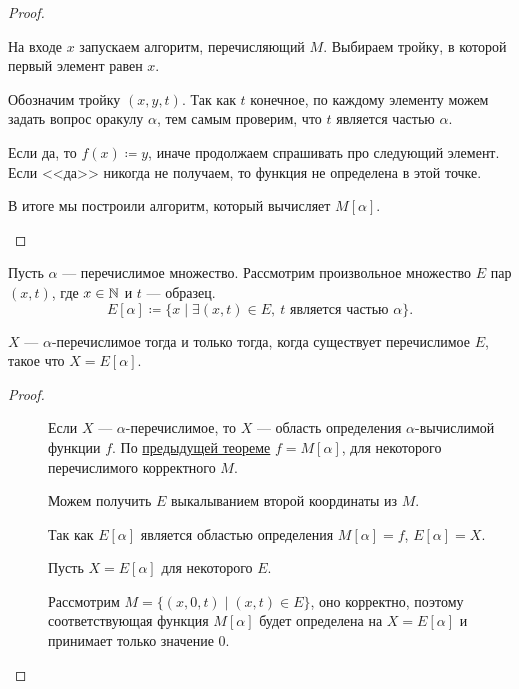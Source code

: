 \begin{proof}
\begin{description}
		   На входе $ x$ запускаем алгоритм, перечисляющий  $ M$. Выбираем тройку, в которой первый элемент равен $ x$. 

		   Обозначим тройку $ (x, y, t)$. Так как  $ t$ конечное, по каждому элементу можем задать вопрос оракулу  $  \alpha $, тем самым проверим, что $ t$ является частью $  \alpha $.

		   Если да, то $ f(x) \coloneqq y$, иначе продолжаем спрашивать про следующий элемент.
		   Если <<да>> никогда не получаем, то функция не определена в этой точке.

		   В итоге мы построили алгоритм, который вычисляет $ M[ \alpha ]$.
   \end{description} 
\end{proof}

\begin{defn}
	Пусть $  \alpha $ --- перечислимое множество. Рассмотрим произвольное множество $ E$ пар  $ (x, t)$, где  $ x \in \mathbb{N}$ и $ t$ --- образец.
	\[
		E[ \alpha ] \coloneqq \{x \mid \exists (x, t) \in E, ~ t \text{ является частью } \alpha \}
	.\] 
\end{defn}

\begin{thm}
	$ X$ --- $  \alpha $-перечислимое тогда и только тогда, когда существует перечислимое $ E$, такое что  $ X = E[ \alpha ]$.
\end{thm}
\begin{proof}
    ~\begin{description}
		\item[]
			Если $ X$ ---  $  \alpha $-перечислимое, то $ X$ --- область определения  $  \alpha $-вычислимой функции $ f$. По \hyperref[thm:malp]{предыдущей теореме} $ f = M[ \alpha ]$, для некоторого перечислимого корректного $ M$.

			Можем получить  $ E$ выкалыванием второй координаты из $ M$.

			Так как $ E[ \alpha ]$ является областью определения $ M[ \alpha ] = f$, $ E[ \alpha ] = X$.
        \item[]
			Пусть $ X = E[ \alpha ]$ для некоторого $ E$.

			Рассмотрим  $ M = \{(x, 0, t) \mid (x, t) \in  E\}$, оно корректно, поэтому соответствующая функция $ M[ \alpha ]$ будет определена на $ X = E[ \alpha ]$ и принимает только значение $ 0$.
    \end{description} 
\end{proof}

